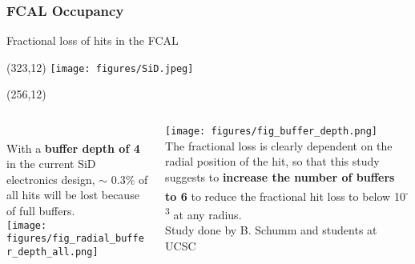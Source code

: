 \documentclass[xcolor={dvipsnames}]{beamer}
\newcommand{\sidlogo}{
  \setlength{\TPHorizModule}{1pt}
  \setlength{\TPVertModule}{1pt}
  \begin{textblock}{1}(323,12)
   \texttt{[image: figures/SiD.jpeg]}
  \end{textblock}
  }
\newcommand{\paper}{
  \setlength{\TPHorizModule}{1pt}
  \setlength{\TPVertModule}{1pt}
  \begin{textblock}{65}(256,12)
  \centering
  \textblockcolour{SpringGreen}
  \vspace*{0.8mm}{arXiv:\\1609.07816v1}\vspace*{0.8mm}
  \end{textblock}
}
\begin{document}
\subsubsection{FCAL Occupancy}
\begin{frame}{Fractional loss of hits in the FCAL}
\sidlogo
\paper
  \begin{columns}
   \begin{column}{0.52\textwidth}
     \vspace*{0.5cm}\\
     With a \textbf{buffer depth of 4} in the current SiD electronics design, $\sim$ 0.3\% of all hits will be lost because of full buffers.\\
     \vspace*{1cm}
     \texttt{[image: figures/fig\_radial\_buffer\_depth\_all.png]}
   \end{column}
   \begin{column}{0.52\textwidth}
     \texttt{[image: figures/fig\_buffer\_depth.png]}\\
     The fractional loss is clearly dependent on the radial position of the hit, so that this study suggests to \textbf{increase the number of buffers to 6} to reduce the fractional hit loss to below 10\textsuperscript{-3} at any radius.\\
    {\hfill \tiny Study done by B. Schumm and students at UCSC}
   \end{column}
  \end{columns}
\end{frame}
\end{document}
